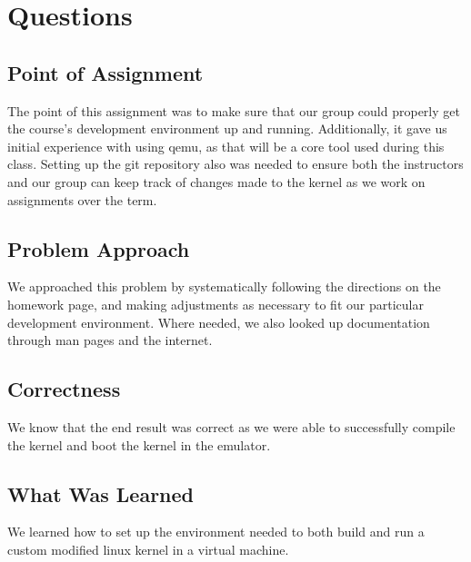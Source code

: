 \section{Questions}
\subsection{Point of Assignment}
The point of this assignment was to make sure that our group could properly get the course's development environment up and running. Additionally, it gave us initial experience with using qemu, as that will be a core tool used during this class. Setting up the git repository also was needed to ensure both the instructors and our group can keep track of changes made to the kernel as we work on assignments over the term. 

\subsection{Problem Approach}
We approached this problem by systematically following the directions on the homework page, and making adjustments as necessary to fit our particular development environment. Where needed, we also looked up documentation through man pages and the internet.

\subsection{Correctness}
We know that the end result was correct as we were able to successfully compile the kernel and boot the kernel in the emulator.

\subsection{What Was Learned}
We learned how to set up the environment needed to both build and run a custom modified linux kernel in a virtual machine.